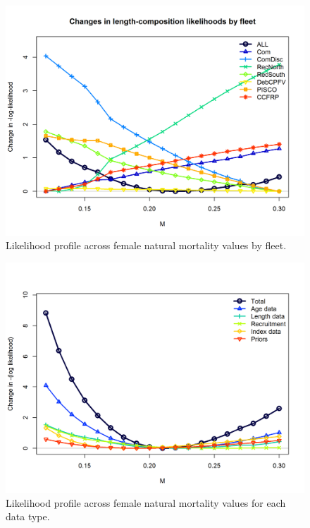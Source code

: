 \documentclass[12pt,]{article}
\begin{document}
\begin{figure}
\centering
\includegraphics{Figures/profile_m_piner.png}
\caption{Likelihood profile across female natural mortality values by
fleet. \label{fig:profile_m_piner}}
\end{figure}

\begin{figure}
\centering
\includegraphics{Figures/profile_m_like.png}
\caption{Likelihood profile across female natural mortality values for
each data type. \label{fig:profile_m_like}}
\end{figure}
\end{document}
